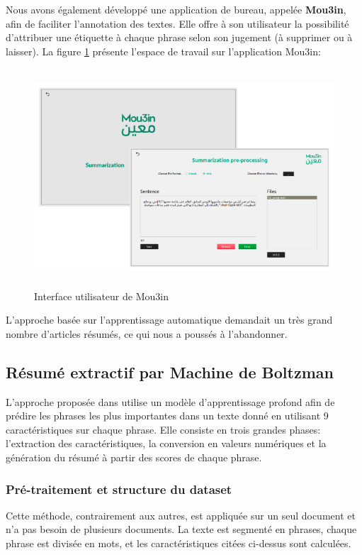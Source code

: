     Nous avons également développé une application de bureau, appelée \textbf{Mou3in}, afin de faciliter l'annotation des textes. Elle offre à son utilisateur la possibilité d'attribuer une étiquette à chaque phrase selon son jugement (à supprimer ou à laisser). La figure \ref{mou3in} présente l'espace de travail sur l'application \textquotedbl Mou3in\textquotedbl :
    \begin{figure}[H]
        \centering
        \includegraphics[height=230pt,width=370pt]{img/chapter4/mou3in/mou3in.png}
        \caption{Interface utilisateur de \textquotedbl Mou3in\textquotedbl}
        \label{mou3in}
    \end{figure}
    
    L'approche basée sur l'apprentissage automatique demandait un très grand nombre d'articles résumés, ce qui nous a poussés à l'abandonner.


\subsection{Résumé extractif par Machine de Boltzman}
L'approche proposée dans \cite{boltzman} utilise un modèle d'apprentissage profond afin de prédire les phrases les plus importantes dans un texte donné en utilisant 9 caractéristiques sur chaque phrase. Elle consiste en trois grandes phases: l'extraction des caractéristiques, la conversion en valeurs numériques et la génération du résumé à partir des scores de chaque phrase. 

    \subsubsection{Pré-traitement et structure du dataset}
    Cette méthode, contrairement aux autres, est appliquée sur un seul document et n'a pas besoin de plusieurs documents. La texte est segmenté en phrases, chaque phrase est divisée en mots, et les caractéristiques citées ci-dessus sont calculées.\\
    
